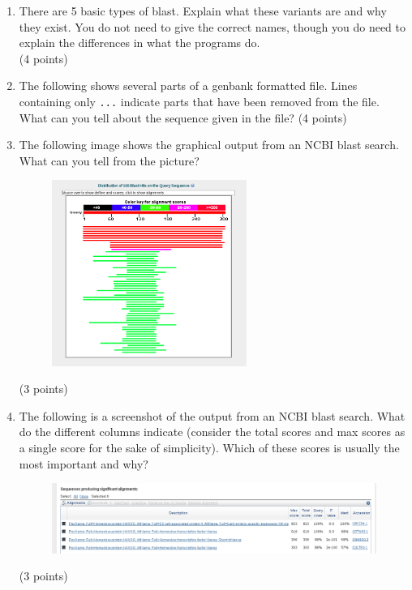 \documentclass[11pt]{article}
\begin{document}
\begin{enumerate}
{  \texttt{S2}.
}\\
(5 points)
\item There are 5 basic types of blast. Explain what these variants are and
  why they exist. You do not need to give the correct names, though you do
  need to explain the differences in what the programs do.\\
  (4 points)
\item The following shows several parts of a genbank formatted file. Lines
  containing only \texttt{...} indicate parts that have been removed from the
  file. What can you tell about the sequence given in the file?
  {\tiny }
  (4 points)
\item The following image shows the graphical output from an NCBI blast
  search. What can you tell from the picture?
  \begin{figure}[H]
  \includegraphics[width=0.6\textwidth]{images/blast_result_image}
  \end{figure}
  (3 points)
\item The following is a screenshot of the output from an NCBI blast
  search. What do the different columns indicate (consider the total scores
  and max scores as a single score for the sake of simplicity). Which of these
  scores is usually the most important and why?
  \begin{figure}[H]
    \includegraphics[width=\textwidth]{images/blast_result_list_top}
  \end{figure}
  (3 points)
  

\end{enumerate}
\end{document}
